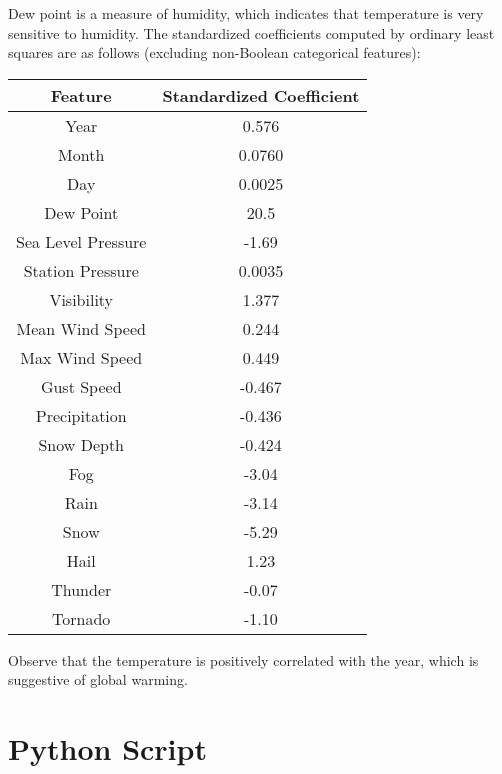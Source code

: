 \documentclass[letterpaper]{article}
\begin{document}
\noindent
Dew point is a measure of humidity, which indicates that temperature
is very sensitive to humidity.  The standardized coefficients computed
by ordinary least squares are as follows (excluding non-Boolean
categorical features):
\begin{table}[H]
  \centering
  \begin{tabular}{c|c}
    Feature & Standardized Coefficient \\ \hline
    Year & 0.576 \\
    Month & 0.0760 \\
    Day & 0.0025 \\
    Dew Point & 20.5 \\
    Sea Level Pressure & -1.69 \\
    Station Pressure & 0.0035 \\
    Visibility & 1.377 \\
    Mean Wind Speed & 0.244  \\
    Max Wind Speed & 0.449 \\
    Gust Speed & -0.467 \\
    Precipitation & -0.436 \\
    Snow Depth & -0.424 \\
    Fog & -3.04 \\
    Rain & -3.14 \\
    Snow & -5.29 \\
    Hail & 1.23 \\
    Thunder & -0.07 \\
    Tornado & -1.10
  \end{tabular}
\end{table}
\noindent Observe that the temperature is positively correlated with
the year, which is suggestive of global warming.

\appendices
\section{Python Script} \label{appendix:python}

\end{document}
